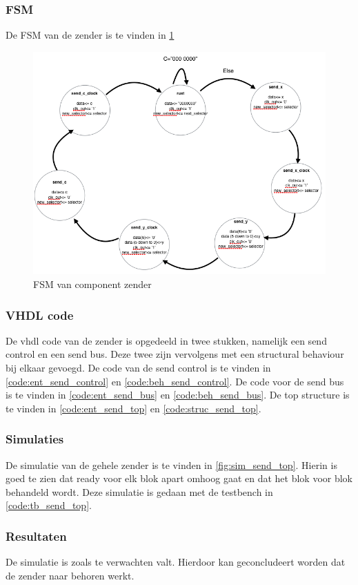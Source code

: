 \subsubsection{FSM}
De FSM van de zender is te vinden in \ref{fig:fsm_zender}
\begin{figure}[h!]
	\center
	\includegraphics[width = 15cm]{Figuren/LCD/fsm_sender.png}
	\caption{FSM van component zender}
	\label{fig:fsm_zender}
\end{figure}

\subsubsection{VHDL code}
De vhdl code van de zender is opgedeeld in twee stukken, namelijk een send control en een send bus. Deze twee zijn vervolgens met een structural behaviour bij elkaar gevoegd. De code van de send control is te vinden in \ref{code:ent_send_control} en \ref{code:beh_send_control}. De code voor de send bus is te vinden in \ref{code:ent_send_bus} en \ref{code:beh_send_bus}. De top structure is te vinden in \ref{code:ent_send_top} en \ref{code:struc_send_top}.

\subsubsection{Simulaties}
De simulatie van de gehele zender is te vinden in \ref{fig:sim_send_top}. Hierin is goed te zien dat ready voor elk blok apart omhoog gaat en dat het blok voor blok behandeld wordt. Deze simulatie is gedaan met de testbench in \ref{code:tb_send_top}.

\subsubsection{Resultaten}
De simulatie is zoals te verwachten valt. Hierdoor kan geconcludeert worden dat de zender naar behoren werkt.